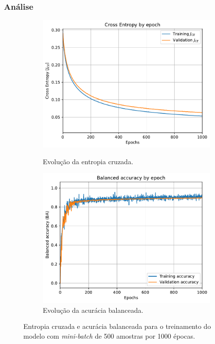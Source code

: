 \subsubsection*{Análise}

\begin{figure}[H]
	\begin{subfigure}[H]{0.49\textwidth}
		\centering
		\includegraphics[width = 0.98\linewidth]{../../plot/LR_1/CE_1000_epochs_batch_size500}
		\label{fig:CE_1000_epochs_batch_size500}
		\caption{Evolução da entropia cruzada.}
	\end{subfigure}
	\begin{subfigure}[H]{0.49\textwidth}
		\centering
		\includegraphics[width = 0.99\linewidth]{../../plot/LR_1/BA_1000_epochs_batch_size500}
		\caption{Evolução da acurácia balanceada.}
		\label{fig:BA_1000_epochs_batch_size500}
	\end{subfigure}
	\caption{Entropia cruzada e acurácia balanceada para o treinamento do modelo com \textit{mini-batch} de 500 amostras por 1000 épocas.}
\end{figure}





